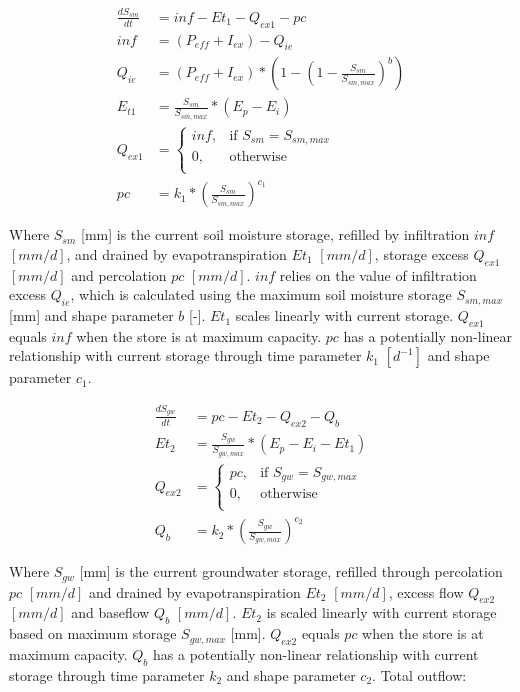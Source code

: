 \begin{align}
	\frac{dS_{sm}}{dt} &= inf-Et_1-Q_{ex1}-pc\\
	inf &= \left(P_{eff}+I_{ex}\right) - Q_{ie} \\
	Q_{ie} &= \left(P_{eff}+I_{ex}\right)*\left(1-\left(1-\frac{S_{sm}}{S_{sm,max}}\right)^b\right)\\
	E_{t1} &= \frac{S_{sm}}{S_{sm,max}}*(E_p-E_i)\\
	Q_{ex1} &= \begin{cases}
		inf, &\text{if }S_{sm} = S_{sm,max}\\
		0, &\text{otherwise}\\
	\end{cases}	\\
	pc &= k_1*\left(\frac{S_{sm}}{S_{sm,max}}\right)^{c_1}
\end{align}

Where $S_{sm}$ [mm] is the current soil moisture storage, refilled by infiltration $inf$  $[mm/d]$, and drained by evapotranspiration $Et_1$  $[mm/d]$, storage excess $Q_{ex1}$  $[mm/d]$ and percolation $pc$  $[mm/d]$. $inf$ relies on the value of infiltration excess $Q_{ie}$, which is calculated using the maximum soil moisture storage $S_{sm,max}$ [mm] and shape parameter $b$ [-]. $Et_1$ scales linearly with current storage. $Q_{ex1}$ equals $inf$ when the store is at maximum capacity. $pc$ has a potentially non-linear relationship with current storage through time parameter $k_1$ $[d^{-1}]$ and shape parameter $c_1$.

\begin{align}
	\frac{dS_{gw}}{dt} &= pc-Et_2-Q_{ex2}-Q_b\\
	Et_2 &= \frac{S_{gw}}{S_{gw,max}}*\left(E_p-E_i-Et_1\right)\\
	Q_{ex2} &= \begin{cases}
		pc, &\text{if }S_{gw} = S_{gw,max}\\
		0, &\text{otherwise}\\
	\end{cases}	\\
	Q_b &=  k_2*\left(\frac{S_{gw}}{S_{gw,max}}\right)^{c_2}
\end{align}

Where $S_{gw}$ [mm] is the current groundwater storage, refilled through percolation $pc$ $[mm/d]$ and drained by evapotranspiration $Et_2$ $[mm/d]$, excess flow $Q_{ex2}$ $[mm/d]$ and baseflow $Q_b$ $[mm/d]$. $Et_2$ is scaled linearly with current storage based on maximum storage $S_{gw,max}$ [mm]. $Q_{ex2}$ equals $pc$ when the store is at maximum capacity. $Q_b$ has a potentially non-linear relationship with current storage through time parameter $k_2$ and shape parameter $c_2$. Total outflow:

